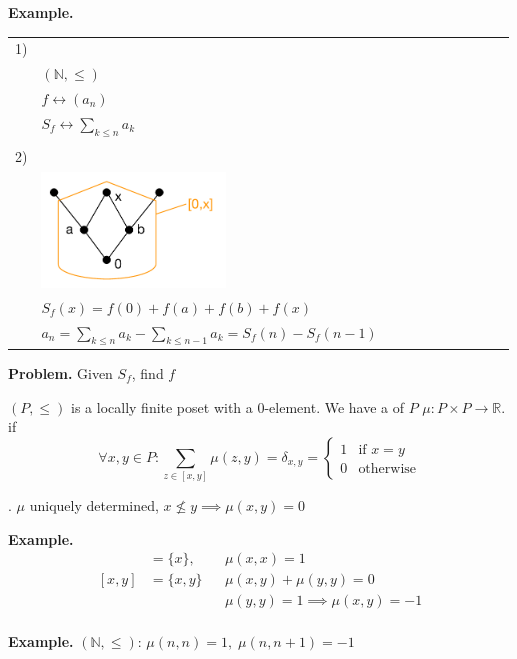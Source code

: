 \textbf{Example.}

\begin{tabular}{ll}
  1) & \\
     & $(\mathbb{N}, \leq)$\\
     & $f \leftrightarrow (a_n)$\\
     & $S_f \leftrightarrow \sum_{k\leq n} a_k$\\\\

  2) & \\
     & \includegraphics[width=0.4\textwidth]
        {02_higher_combinatorics/pics/LatticeInterval}\\
     & $S_f(x) = f(0) + f(a) + f(b) + f(x) $\\
     & $a_n = \sum_{k \leq n} a_k - \sum_{k \leq n-1} a_k =
              S_f(n) - S_f(n-1)$\\
\end{tabular}

\textbf{Problem.}
Given $S_f$, find $f$

\begin{definition}
$(P, \leq)$ is a locally finite poset with a 0-element.
We have a  of $P$ $\mu: P\times P \rightarrow \mathbb{R}$.
if
\[
  \forall x,y \in P: \sum_{z\in [x, y]} \mu(z,y) = \delta_{x,y} =
    \begin{cases}
      1 & \text{if } x = y \\
      0 & \text{otherwise}
    \end{cases}
\]
\end{definition}

\Remark.
$\mu$ uniquely determined, $x \not\leq y \implies \mu(x,y) = 0$

\textbf{Example.}
\begin{align*}
  [x,x] & = \{x\}, && \mu(x,x) = 1 \\
  [x,y] &= \{x,y\} && \mu(x,y) + \mu(y,y) = 0 \\
        &          && \mu(y,y) = 1 \implies \mu(x,y) = -1 \\
\end{align*}

\textbf{Example.}
$(\mathbb{N}, \leq)$: $\mu(n,n) = 1,\; \mu(n,n+1) = -1$

